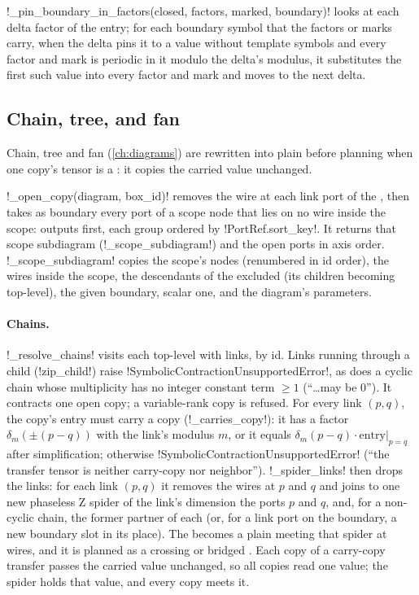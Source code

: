 \py!_pin_boundary_in_factors(closed, factors, marked, boundary)! looks at each delta factor of the entry; for each boundary symbol that the factors or marks carry, when the delta pins it to a value without template symbols and every factor and mark is periodic in it modulo the delta's modulus, it substitutes the first such value into every factor and mark and moves to the next delta.

\subsection{Chain, tree, and fan \texorpdfstring{\bboxes{}}{!-boxes}}\label{sec:semantics-symbolic-chains}

Chain, tree and fan \bboxes{} (\cref{ch:diagrams}) are rewritten into plain \bboxes{} before planning when one copy's tensor is a : it copies the carried value unchanged.

\begin{definition}\label{def:semantics-open-copy}
\py!_open_copy(diagram, box_id)! removes the wire at each link port of the \bbox{}, then takes as boundary every port of a scope node that lies on no wire inside the scope: outputs first, each group ordered by \py!PortRef.sort_key!. It returns that scope subdiagram (\py!_scope_subdiagram!) and the open ports in axis order. \py!_scope_subdiagram! copies the scope's nodes (renumbered in id order), the wires inside the scope, the descendants of the excluded \bbox{} (its children becoming top-level), the given boundary, scalar one, and the diagram's parameters.
\end{definition}

\paragraph{Chains.} \py!_resolve_chains! visits each top-level \bbox{} with links, by id. Links running through a child \bbox{} (\py!zip_child!) raise \py!SymbolicContractionUnsupportedError!, as does a cyclic chain whose multiplicity has no integer constant term $\ge1$ (``\ldots may be 0''). It contracts one open copy; a variable-rank copy is refused. For every link $(p,q)$, the copy's entry must carry a copy (\py!_carries_copy!): it has a factor $\delta_m(\pm(p-q))$ with the link's modulus $m$, or it equals $\delta_m(p-q)\cdot\text{entry}|_{p=q}$ after simplification; otherwise \py!SymbolicContractionUnsupportedError! (``the transfer tensor is neither carry-copy nor neighbor''). \py!_spider_links! then drops the links: for each link $(p,q)$ it removes the wires at $p$ and $q$ and joins to one new phaseless Z spider of the link's dimension the ports $p$ and $q$, and, for a non-cyclic chain, the former partner of each (or, for a link port on the boundary, a new boundary slot in its place). The \bbox{} becomes a plain \bbox{} meeting that spider at wires, and it is planned as a crossing or bridged \bbox{}. Each copy of a carry-copy transfer passes the carried value unchanged, so all copies read one value; the spider holds that value, and every copy meets it.

